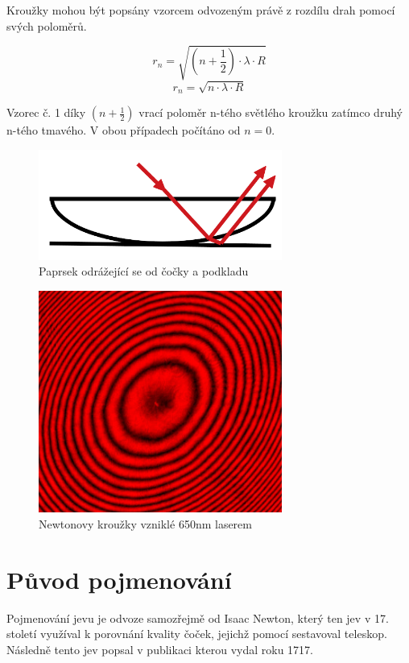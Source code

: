 \documentclass[a4paper, 12pt]{article}
\begin{document}
Kroužky mohou být popsány vzorcem odvozeným právě z rozdílu drah pomocí svých poloměrů.
		\begin{center}
		\begin{equation}
		\label{vzorec1}
			r_n = \sqrt{(n+\frac{1}{2}) \cdot \lambda \cdot R } 	
		\end{equation}
		\begin{equation}
		\label{vzorec2}
		r_n = \sqrt{n \cdot \lambda \cdot R } 
		\end{equation} 
		\end{center}  
 Vzorec č. 1 díky  $(n+\frac{1}{2})$ vrací poloměr n-tého světlého kroužku zatímco druhý n-tého tmavého. V obou případech počítáno od $n=0$.
  \begin{figure}
 	\begin{center}
 		
 		\includegraphics[width=8cm]{inter}
 		\caption{Paprsek odrážející se od čočky a podkladu }
 		\label{cocka}
 	\end{center}
 \end{figure}
  \begin{figure}

	\begin{center}
		
		\includegraphics[width=8cm]{nr2}
		\caption{Newtonovy kroužky vzniklé 650nm laserem\cite{ceska}}
		\label{obr2}
	\end{center}
\end{figure}
\section{Původ pojmenování}
Pojmenování jevu je odvoze samozřejmě od Isaac Newton, který ten jev v 17. století využíval k porovnání kvality čoček, jejichž pomocí sestavoval teleskop. Následně tento jev popsal v publikaci kterou vydal roku 1717.
\end{document}
